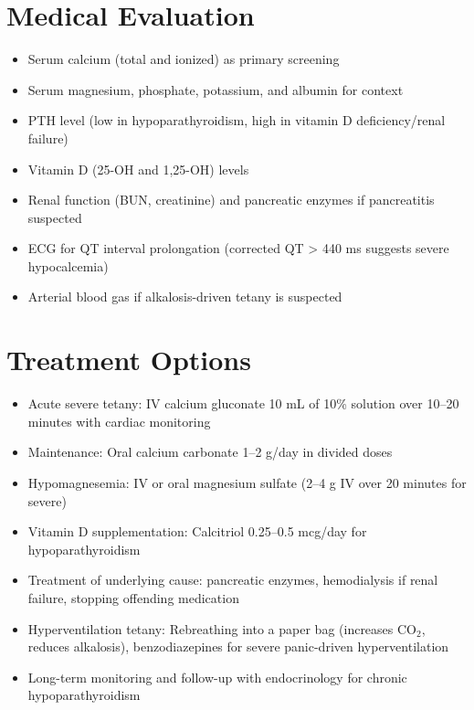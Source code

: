 \section*{Medical Evaluation}
\begin{itemize}
  \item Serum calcium (total and ionized) as primary screening
  \item Serum magnesium, phosphate, potassium, and albumin for context
  \item PTH level (low in hypoparathyroidism, high in vitamin D deficiency/renal failure)
  \item Vitamin D (25-OH and 1,25-OH) levels
  \item Renal function (BUN, creatinine) and pancreatic enzymes if pancreatitis suspected
  \item ECG for QT interval prolongation (corrected QT > 440 ms suggests severe hypocalcemia)
  \item Arterial blood gas if alkalosis-driven tetany is suspected
\end{itemize}

\section*{Treatment Options}
\begin{itemize}
  \item Acute severe tetany: IV calcium gluconate 10 mL of 10\% solution over 10--20 minutes with cardiac monitoring
  \item Maintenance: Oral calcium carbonate 1--2 g/day in divided doses
  \item Hypomagnesemia: IV or oral magnesium sulfate (2--4 g IV over 20 minutes for severe)
  \item Vitamin D supplementation: Calcitriol 0.25--0.5 mcg/day for hypoparathyroidism
  \item Treatment of underlying cause: pancreatic enzymes, hemodialysis if renal failure, stopping offending medication
  \item Hyperventilation tetany: Rebreathing into a paper bag (increases CO$_2$, reduces alkalosis), benzodiazepines for severe panic-driven hyperventilation
  \item Long-term monitoring and follow-up with endocrinology for chronic hypoparathyroidism
\end{itemize}

